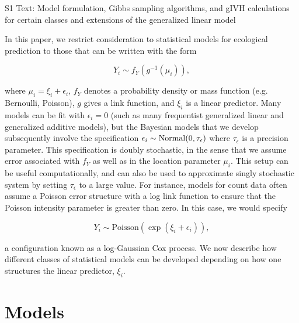 \documentclass[12pt,fleqn]{article}
\begin{document}
\rm \begin{flushleft}

\raggedbottom
\vspace{.5in}

\begin{center}
S1 Text: Model formulation, Gibbs sampling algorithms, and gIVH calculations for certain classes and extensions of the generalized linear model
\bigskip
\end{center}
\vspace{.3in}

\doublespacing



In this paper, we restrict consideration to statistical models for ecological prediction to those that can be written with the form
\begin{linenomath*}
\begin{equation}
  \label{eq:basic_model}
  Y_i \sim f_Y(g^{-1}(\mu_i)),
\end{equation}
\end{linenomath*}
where $\mu_i=\xi_i + \epsilon_i$, $f_Y$ denotes a probability density or mass function (e.g. Bernoulli, Poisson), $g$ gives a link function, and
$\xi_i$ is a linear predictor.  Many models can be fit with $\epsilon_i = 0$ (such as many frequentist generalized linear and generalized additive models), but the Bayesian models that we develop subsequently involve the specification $\epsilon_i \sim {\rm Normal}(0,\tau_\epsilon)$ where $\tau_\epsilon$ is a precision parameter.  This specification is doubly stochastic, in the sense that we assume error associated with $f_Y$ as well as in the location parameter $\mu_i$.  This setup can be useful computationally, and can also be used to approximate singly stochastic system by setting $\tau_\epsilon$ to a large value.  For instance, models for count data often assume a Poisson error structure with a log link function to ensure that the Poisson intensity parameter is greater than zero.  In this case, we would specify
\begin{linenomath*}
\begin{equation*}
  Y_i \sim \mathrm{Poisson}(\exp(\xi_i + \epsilon_i)),
\end{equation*}
\end{linenomath*}
a configuration known as a log-Gaussian Cox process.
We now describe how different classes of statistical models can be developed depending on how one structures the linear predictor, $\xi_i$.

\section{Models}

\end{flushleft}
\end{document}

